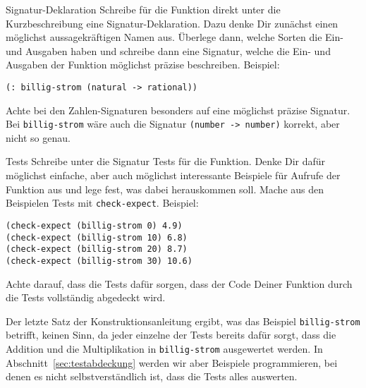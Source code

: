 \begin{konstruktionsanleitung}{Signatur-Deklaration}
  \label{ka:signatur-deklaration}
  Schreibe für die Funktion direkt unter die Kurzbeschreibung eine
  Signatur-Deklaration.  Dazu denke Dir zunächst einen möglichst
  aussagekräftigen Namen aus.  Überlege dann, welche Sorten die Ein-
  und Ausgaben haben und schreibe dann eine Signatur, welche die Ein-
  und Ausgaben der Funktion möglichst präzise beschreiben.  Beispiel:
  \begin{lstlisting}
(: billig-strom (natural -> rational))
\end{lstlisting}
  Achte bei den Zahlen-Signaturen besonders auf eine möglichst präzise
  Signatur.  Bei \lstinline{billig-strom} wäre auch die Signatur
  \lstinline{(number -> number)} korrekt, aber nicht so genau.
\end{konstruktionsanleitung}

\begin{konstruktionsanleitung}{Tests}
  \label{ka:tests}
  Schreibe unter die Signatur Tests für die Funktion.  Denke Dir dafür
  möglichst einfache, aber auch möglichst interessante
  Beispiele für Aufrufe der Funktion aus und lege fest, was dabei
  herauskommen soll.  Mache aus den Beispielen Tests mit
  \lstinline{check-expect}.  Beispiel:
\begin{lstlisting}
(check-expect (billig-strom 0) 4.9)
(check-expect (billig-strom 10) 6.8)
(check-expect (billig-strom 20) 8.7)
(check-expect (billig-strom 30) 10.6)
\end{lstlisting}
  Achte darauf, dass die Tests dafür sorgen, dass der Code Deiner
  Funktion durch die Tests vollständig abgedeckt wird.
\end{konstruktionsanleitung}
%
Der letzte Satz der Konstruktionsanleitung ergibt, was das Beispiel
\lstinline{billig-strom} betrifft, keinen Sinn, da jeder einzelne der
Tests bereits dafür
sorgt, dass die Addition und die Multiplikation in
\lstinline{billig-strom} ausgewertet werden.  In
Abschnitt~\ref{sec:testabdeckung} werden wir aber Beispiele
programmieren, bei denen es nicht selbstverständlich ist, dass die
Tests alles auswerten.

